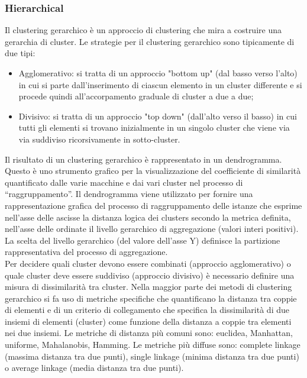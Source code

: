 \subsubsection{Hierarchical}
Il clustering gerarchico è un approccio di clustering che mira a costruire una gerarchia di cluster. Le strategie per il clustering gerarchico sono tipicamente di due tipi:
\begin{itemize}
	\item Agglomerativo: si tratta di un approccio "bottom up" (dal basso verso l'alto) in cui si parte dall'inserimento di ciascun elemento in un cluster differente e si procede quindi all'accorpamento graduale di cluster a due a due;
	\item Divisivo: si tratta di un approccio "top down" (dall'alto verso il basso) in cui tutti gli elementi si trovano inizialmente in un singolo cluster che viene via via suddiviso ricorsivamente in sotto-cluster.
\end{itemize}
Il risultato di un clustering gerarchico è rappresentato in un dendrogramma. Questo è uno strumento grafico per la visualizzazione del coefficiente di similarità quantificato dalle varie macchine e dai vari cluster nel processo di “raggruppamento”. Il dendrogramma viene utilizzato per fornire una rappresentazione grafica del processo di raggruppamento delle istanze che esprime nell'asse delle ascisse la distanza logica dei clusters secondo la metrica definita, nell'asse delle ordinate il livello gerarchico di aggregazione (valori interi positivi). 
La scelta del livello gerarchico (del valore dell'asse Y) definisce la partizione rappresentativa del processo di aggregazione.\\
Per decidere quali cluster devono essere combinati (approccio agglomerativo) o quale cluster deve essere suddiviso (approccio divisivo) è necessario definire una misura di dissimilarità tra cluster. Nella maggior parte dei metodi di clustering gerarchico si fa uso di metriche specifiche che quantificano la distanza tra coppie di elementi e di un criterio di collegamento che specifica la dissimilarità di due insiemi di elementi (cluster) come funzione della distanza a coppie tra elementi nei due insiemi. Le metriche di distanza più comuni sono: euclidea, Manhattan, uniforme, Mahalanobis, Hamming. Le metriche più diffuse sono: complete linkage (massima distanza tra due punti), single linkage (minima distanza tra due punti) o average linkage (media distanza tra due punti).
